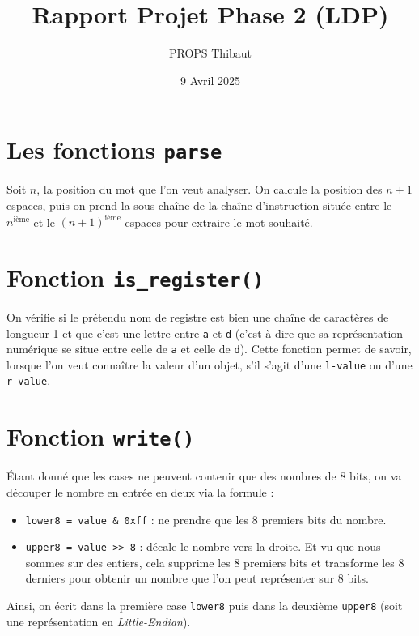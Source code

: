 \documentclass[a4paper,12pt]{article}
\title{Rapport Projet Phase 2 (LDP)}
\author{PROPS Thibaut}
\date{9 Avril 2025}
\begin{document}
\maketitle

\section*{Les fonctions \texttt{parse}}

Soit $n$, la position du mot que l'on veut analyser.  
On calcule la position des $n + 1$ espaces, puis on prend la sous-chaîne de la chaîne d'instruction située entre le $n^\text{ième}$ et le $(n+1)^\text{ième}$ espaces pour extraire le mot souhaité.

\section*{Fonction \texttt{is\_register()}}

On vérifie si le prétendu nom de registre est bien une chaîne de caractères de longueur 1 et que c’est une lettre entre \texttt{a} et \texttt{d} (c’est-à-dire que sa représentation numérique se situe entre celle de \texttt{a} et celle de \texttt{d}).  
Cette fonction permet de savoir, lorsque l'on veut connaître la valeur d’un objet, s’il s’agit d’une \texttt{l-value} ou d’une \texttt{r-value}.

\section*{Fonction \texttt{write()}}

Étant donné que les cases ne peuvent contenir que des nombres de 8 bits, on va découper le nombre en entrée en deux via la formule :

\vspace{0.5em} 

\begin{itemize}
  \item \texttt{lower8 = value \& 0xff} : ne prendre que les 8 premiers bits du nombre.
  \item \texttt{upper8 = value >> 8} : décale le nombre vers la droite. Et vu que nous sommes sur des entiers, cela supprime les 8 premiers bits et transforme les 8 derniers pour obtenir un nombre que l’on peut représenter sur 8 bits.
\end{itemize}

\vspace{0.5em} 

Ainsi, on écrit dans la première case \texttt{lower8} puis dans la deuxième \texttt{upper8} (soit une représentation en \textit{Little-Endian}).
\end{document}
